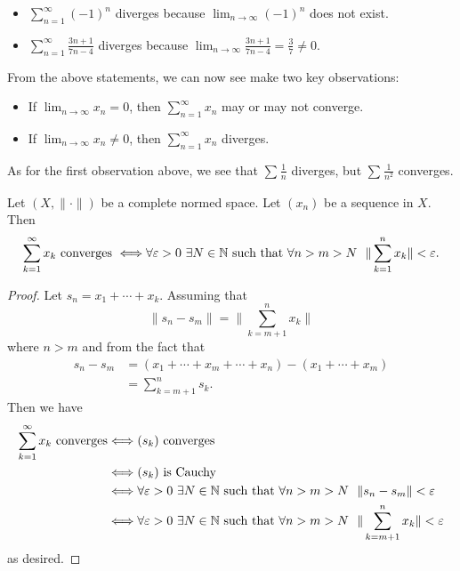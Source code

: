 \documentclass[a4paper]{article}
\begin{document}
\begin{eg}
    \begin{itemize}
        \item \( \sum_{ n=1  }^{ \infty  } (-1)^{n} \) diverges because \( \lim_{ n \to \infty  }  (-1)^{n} \) does not exist.
        \item \( \sum_{ n=1  }^{ \infty  } \frac{ 3n+1 }{ 7n-4 }  \) diverges because \( \lim_{ n \to \infty  }  \frac{ 3n + 1 }{ 7 n - 4  }  = \frac{ 3 }{ 7 } \neq 0  \).
    \end{itemize}
\end{eg}

From the above statements, we can now see make two key observations:

\begin{itemize}
    \item If \( \lim_{ n \to \infty  }  {x}_{n} = 0  \), then \( \sum_{ n=1  }^{ \infty  } {x}_{n} \) may or may not converge.
    \item If \( \lim_{ n \to \infty  }  {x}_{n} \neq 0  \), then \( \sum_{ n=1  }^{ \infty  } {x}_{n}  \) diverges.
\end{itemize}

As for the first observation above, we see that \( \sum_{  }^{  } \frac{ 1 }{ n }  \) diverges, but \( \sum_{   }^{  } \frac{ 1 }{ n^{2} }   \) converges.

\begin{theorem}
    Let \( (X,\|\cdot\|) \) be a complete normed space. Let \( ({x}_{n}) \) be a sequence in \( X  \). Then
    \[  \sum_{ k=1  }^{ \infty  } {x}_{k } \ \text{converges} \ \iff \forall \epsilon > 0 \ \exists N \in \N \ \text{such that} \ \forall n > m > N \ \ \|\sum_{ k=1  }^{ n } {x}_{k } \| < \epsilon. \]
\end{theorem}
\begin{proof}
Let \( {s}_{n} = {x}_{1} + \cdots + {x}_{k} \). Assuming that  
\[  \|{s}_{n} - {s}_{m} \| = \Big\|\sum_{ k=m+1 }^{ n } {x}_{k} \Big\| \]
where \( n > m  \) and from the fact that 
\begin{align*}
    {s}_{n} - {s}_{m} &= ({x}_{1} + \cdots + {x}_{m} + \cdots + {x}_{n}) - ({x}_{1} +  \cdots + {x}_{m}) \\
                      &= \sum_{ k= m+1 }^{ n } {s}_{k}.
\end{align*}
Then we have 
\begin{align*}
    \sum_{ k=1  }^{ \infty  } {x}_{k } \ \text{converges} &\Longleftrightarrow ({s}_{k}) \ \text{converges} \\
                                                          &\Longleftrightarrow ({s}_{k}) \ \text{is Cauchy} \\
                                                          &\Longleftrightarrow \forall \varepsilon > 0 \ \exists N \in \mathbb{N} \ \text{such that} \ \forall n > m > N \  \ \|{s}_{n} - {s}_{m} \| < \varepsilon \\
                                                          &\Longleftrightarrow \forall \varepsilon > 0 \ \exists N \in \mathbb{N} \ \text{such that} \ \forall n > m > N \ \ \|\sum_{ k=m+1 }^{ n } {x}_{k} \| < \varepsilon
\end{align*}
as desired.
\end{proof}
\end{document}
